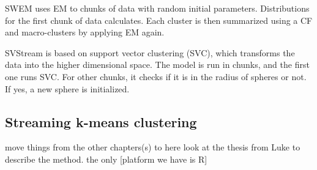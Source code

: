 \documentclass[../UNBThesis2.tex]{subfiles}
\begin{document}
\begin{itemize}
SWEM \cite{dang2009based} uses EM to chunks of data with random initial parameters. Distributions for the first chunk of data calculates. Each cluster is then summarized using a CF and macro-clusters by applying EM again.

SVStream \cite{wang2011svstream} is based on support vector clustering (SVC), which transforms the data into the higher dimensional space. The model is run in chunks, and the first one runs SVC. For other chunks, it checks if it is in the radius of spheres or not. If yes, a new sphere is initialized. 






\end{itemize}

\subsection{Streaming k-means clustering}

move things from the other chapters(s) to here
look at the thesis from Luke to describe the method. the only [platform we have is R]
   	    

         
\end{document}
